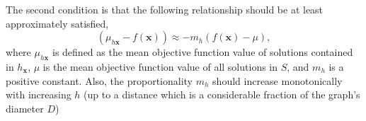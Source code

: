 The second condition is that the following relationship should be at least approximately satisfied,
$$
(\mu_{h\mathbf{x}}-f(\mathbf{x}))\approx -m_h (f(\mathbf{x})-\mu),
$$
where $\mu_{h\mathbf{x}}$ is defined as the mean objective function value of solutions contained in $h_{\mathbf{x}}$, $\mu$ is the mean objective function value of all solutions in $S$, and $m_h$ is a positive constant. Also, the proportionality $m_h$ should increase monotonically with increasing $h$ (up to a distance which is a considerable fraction of the graph's diameter $D$)